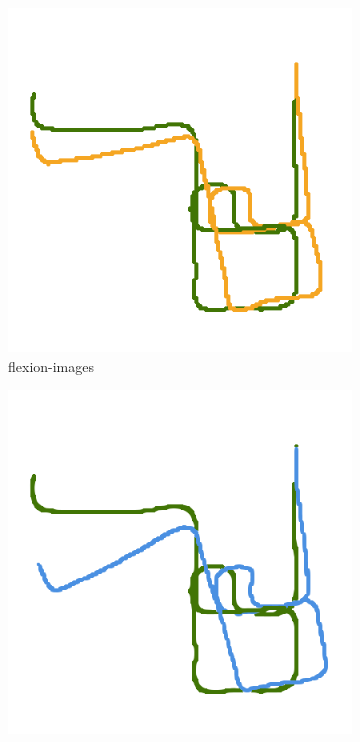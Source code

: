 \begin{figure}[htp]
\begin{subfigure}[b]{0.31\linewidth}
    \includegraphics[width=\linewidth]{chapter06/odo/jonas_flexion_AKAZE_nice.png}%
    \caption{\glspl{flexion-image}}
\end{subfigure}%
\begin{subfigure}[b]{0.31\linewidth}
    \includegraphics[width=\linewidth]{chapter06/odo/jonas_bearing_AKAZE_nice.png}%

\end{subfigure}
\end{figure}
